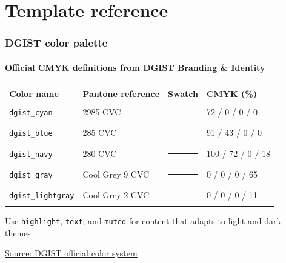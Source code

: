 \documentclass[10pt,aspectratio=169]{dgist_beamer}
\begin{document}
\section{Template reference}
\dgistsectionframe

\begin{frame}
  \frametitle{DGIST color palette}
  \framesubtitle{Official CMYK definitions from DGIST Branding \& Identity}
  \renewcommand{\arraystretch}{1.3}
  \begin{center}\small
    \begin{tabular}{@{}llcl@{}}
      \toprule
      Color name & Pantone reference & Swatch & CMYK (\%)\\
      \midrule
      \texttt{dgist\_cyan} & 2985 CVC & \textcolor{dgist_cyan}{\rule{1.1cm}{.24cm}} & 72 / 0 / 0 / 0\\
      \texttt{dgist\_blue} & 285 CVC & \textcolor{dgist_blue}{\rule{1.1cm}{.24cm}} & 91 / 43 / 0 / 0\\
      \texttt{dgist\_navy} & 280 CVC & \textcolor{dgist_navy}{\rule{1.1cm}{.24cm}} & 100 / 72 / 0 / 18\\
      \texttt{dgist\_gray} & Cool Grey 9 CVC & \textcolor{dgist_gray}{\rule{1.1cm}{.24cm}} & 0 / 0 / 0 / 65\\
      \texttt{dgist\_lightgray} & Cool Grey 2 CVC & \textcolor{dgist_lightgray}{\rule{1.1cm}{.24cm}} & 0 / 0 / 0 / 11\\
      \bottomrule
    \end{tabular}
  \end{center}
  \vspace{.15cm}
  {\small Use \texttt{highlight}, \texttt{text}, and \texttt{muted} for content
  that adapts to light and dark themes.}\par\medskip
  {\scriptsize\href{https://www.dgist.ac.kr/eng/sub01_02_04_01.do}{Source: DGIST official color system}}
\end{frame}
\end{document}
